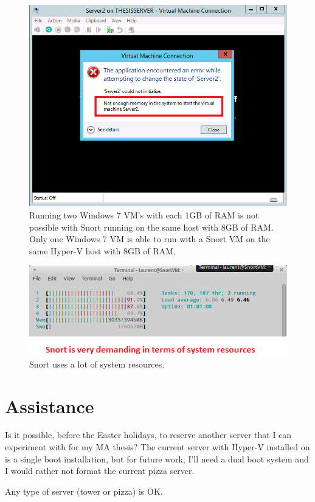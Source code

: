 \documentclass[11pt, a4paper]{article}
\begin{document}
\begin{figure}[h]
    \centering
    \includegraphics[width=1\textwidth]{Mem.png}
   \caption{Running two Windows 7 VM's with each 1GB of RAM is not possible with Snort running on the same host with 8GB of RAM. Only one Windows 7 VM is able to run with a Snort VM on the same Hyper-V host with 8GB of RAM.}
\end{figure}
\begin{figure}[h]
    \centering
    \includegraphics[width=1\textwidth]{Mem_2.png}
   \caption{Snort uses a lot of system resources.}
\end{figure}
\clearpage
\section*{Assistance}

Is it possible, before the Easter holidays, to reserve another server that I can experiment with for my MA thesis? The current server with Hyper-V installed on is a single boot installation, but for future work, I'll need a dual boot system and I would rather not format the current pizza server.

Any type of server (tower or pizza) is OK.
\end{document}

